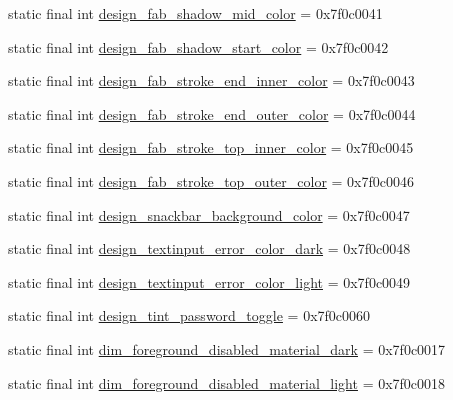 \begin{CompactItemize}
static final int \hyperlink{classandroid_1_1support_1_1mediacompat_1_1_r_1_1color_1ee92aac17c324d9727b9ce060e1f5b9}{design\_\-fab\_\-shadow\_\-mid\_\-color} = 0x7f0c0041
\item 
static final int \hyperlink{classandroid_1_1support_1_1mediacompat_1_1_r_1_1color_c7daa50c00afeace436d0bdc3e216c2c}{design\_\-fab\_\-shadow\_\-start\_\-color} = 0x7f0c0042
\item 
static final int \hyperlink{classandroid_1_1support_1_1mediacompat_1_1_r_1_1color_9c87a6306cefa143d2ddd01ee0ead848}{design\_\-fab\_\-stroke\_\-end\_\-inner\_\-color} = 0x7f0c0043
\item 
static final int \hyperlink{classandroid_1_1support_1_1mediacompat_1_1_r_1_1color_67446c38c00592521187c30d3ac287a1}{design\_\-fab\_\-stroke\_\-end\_\-outer\_\-color} = 0x7f0c0044
\item 
static final int \hyperlink{classandroid_1_1support_1_1mediacompat_1_1_r_1_1color_f482a85577ea405ca196a1d9e5686ca9}{design\_\-fab\_\-stroke\_\-top\_\-inner\_\-color} = 0x7f0c0045
\item 
static final int \hyperlink{classandroid_1_1support_1_1mediacompat_1_1_r_1_1color_4fb231db3ceb08dc6e56890cc30f81a7}{design\_\-fab\_\-stroke\_\-top\_\-outer\_\-color} = 0x7f0c0046
\item 
static final int \hyperlink{classandroid_1_1support_1_1mediacompat_1_1_r_1_1color_c8243a2a1feca5b1aa597b03890d37d3}{design\_\-snackbar\_\-background\_\-color} = 0x7f0c0047
\item 
static final int \hyperlink{classandroid_1_1support_1_1mediacompat_1_1_r_1_1color_3f696820cd85c9fe241943ca743c8048}{design\_\-textinput\_\-error\_\-color\_\-dark} = 0x7f0c0048
\item 
static final int \hyperlink{classandroid_1_1support_1_1mediacompat_1_1_r_1_1color_cc74f18897b26af35d906ad5a8dfd655}{design\_\-textinput\_\-error\_\-color\_\-light} = 0x7f0c0049
\item 
static final int \hyperlink{classandroid_1_1support_1_1mediacompat_1_1_r_1_1color_f4ca50487cf1d6aa5ae6af001c252c75}{design\_\-tint\_\-password\_\-toggle} = 0x7f0c0060
\item 
static final int \hyperlink{classandroid_1_1support_1_1mediacompat_1_1_r_1_1color_379580a08c89cd3afd5cd16427743725}{dim\_\-foreground\_\-disabled\_\-material\_\-dark} = 0x7f0c0017
\item 
static final int \hyperlink{classandroid_1_1support_1_1mediacompat_1_1_r_1_1color_5189d592c165b13be8a6128bc353cdfb}{dim\_\-foreground\_\-disabled\_\-material\_\-light} = 0x7f0c0018

\end{CompactItemize}
